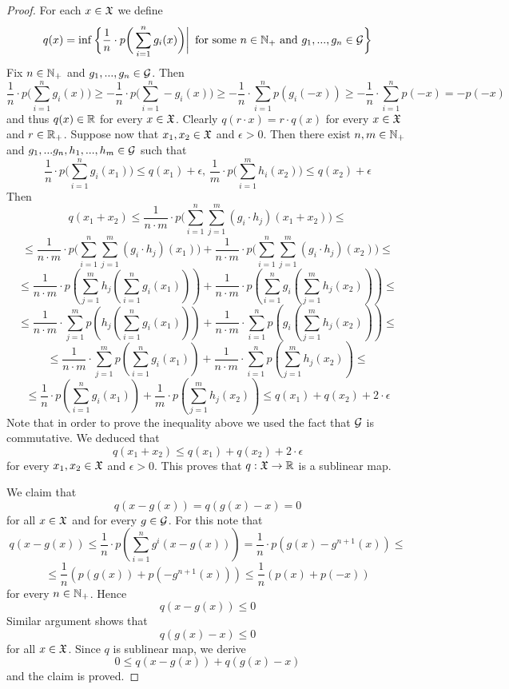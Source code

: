 \documentclass[10pt]{amsart}
\begin{document}
\begin{proof}
	For each $x \in {\mathfrak X}$ we define
	$$q(x) = \inf \bigg\{\frac{1}{n}\cdot p\bigg(\sum_{i=1}^ng_i(x)\bigg)\bigg|\,\mbox{ for some }n\in {\mathbb N}_+\mbox{ and }g_1,...,g_n\in {\mathcal G}\bigg\}$$
	Fix $n\in {\mathbb N}_+$ and $g_1,...,g_n\in {\mathcal G}$. Then
	$$\frac{1}{n}\cdot p\bigg(\sum_{i=1}^ng_i(x)\bigg)\geq -\frac{1}{n}\cdot p\bigg(\sum_{i=1}^n-g_i(x)\bigg) \geq -\frac{1}{n}\cdot \sum_{i=1}^np\left(g_i(-x)\right) \geq -\frac{1}{n}\cdot \sum_{i=1}^np\left(-x\right) = -p(-x)$$
	and thus $q(x) \in {\mathbb R}$ for every $x\in {\mathfrak X}$. Clearly $q(r\cdot x) = r\cdot q(x)$ for every $x\in {\mathfrak X}$ and $r\in {\mathbb R}_+$. Suppose now that $x_1,x_2\in {\mathfrak X}$ and $\epsilon > 0$. Then there exist $n,m \in {\mathbb N}_+$ and $g_1,...g_n,h_1,...,h_m \in {\mathcal G}$ such that
	$$\frac{1}{n}\cdot p\bigg(\sum_{i=1}^ng_i(x_1)\bigg) \leq q(x_1) + \epsilon,\,\frac{1}{m}\cdot p\bigg(\sum_{i=1}^m h_i(x_2)\bigg) \leq q(x_2) + \epsilon$$
	Then
	$$q(x_1 + x_2) \leq \frac{1}{n\cdot m}\cdot p\bigg(\sum_{i=1}^n\sum_{j=1}^m\left(g_i\cdot h_j\right)(x_1 + x_2)\bigg) \leq$$
	$$\leq \frac{1}{n\cdot m}\cdot p\bigg(\sum_{i=1}^n\sum_{j=1}^m \left(g_i\cdot h_j\right)(x_1)\bigg) + \frac{1}{n\cdot m}\cdot p\bigg(\sum_{i=1}^n\sum_{j=1}^m\left(g_i\cdot h_j\right)(x_2)\bigg) \leq$$
	$$\leq \frac{1}{n\cdot m}\cdot p\left(\sum_{j=1}^m h_j\left(\sum_{i=1}^n g_i\left(x_1\right)\right)\right) + \frac{1}{n\cdot m}\cdot p\left(\sum_{i=1}^n g_i\left(\sum_{j=1}^m h_j\left(x_2\right)\right)\right) \leq $$
	$$\leq \frac{1}{n\cdot m}\cdot \sum_{j=1}^m p\left(h_j\left(\sum_{i=1}^n g_i\left(x_1\right)\right)\right) + \frac{1}{n\cdot m}\cdot \sum_{i=1}^n p\left(g_i\left(\sum_{j=1}^m h_j\left(x_2\right)\right)\right) \leq $$
	$$\leq \frac{1}{n\cdot m}\cdot \sum_{j=1}^m p\left(\sum_{i=1}^n g_i\left(x_1\right)\right) + \frac{1}{n\cdot m}\cdot \sum_{i=1}^n p\left(\sum_{j=1}^m h_j\left(x_2\right)\right) \leq $$
	$$\leq  \frac{1}{n}\cdot p\left(\sum_{i=1}^n g_i\left(x_1\right)\right) + \frac{1}{m}\cdot p\left(\sum_{j=1}^m h_j\left(x_2\right)\right) \leq q(x_1) + q(x_2) + 2\cdot \epsilon$$
	Note that in order to prove the inequality above we used the fact that ${\mathcal G}$ is commutative. We deduced that
	$$q(x_1 + x_2) \leq q(x_1) + q(x_2) + 2\cdot \epsilon$$
	for every $x_1,x_2\in {\mathfrak X}$ and $\epsilon > 0$. This proves that $q:{\mathfrak X} \rightarrow {\mathbb R}$ is a sublinear map.

	We claim that
	$$q\left(x - g(x)\right) = q\left(g(x) - x\right) = 0$$
	for all $x\in {\mathfrak X}$ and for every $g\in {\mathcal G}$. For this note that
	$$q\left(x - g(x)\right) \leq \frac{1}{n}\cdot p\left(\sum_{i=1}^ng^i\left(x - g(x)\right)\right) = \frac{1}{n}\cdot p\left(g(x) - g^{n+1}(x)\right) \leq$$
	$$\leq \frac{1}{n}\left(p\left(g(x)\right) + p\left(-g^{n+1}(x)\right)\right) \leq \frac{1}{n}\left(p(x) + p(-x)\right)$$
	for every $n\in {\mathbb N}_+$. Hence
	$$q\left(x - g(x)\right) \leq 0$$
	Similar argument shows that
	$$q\left(g(x) - x\right) \leq 0$$
	for all $x \in {\mathfrak X}$. Since $q$ is sublinear map, we derive
	$$0 \leq q\left(x - g(x)\right) + q\left(g(x) - x\right)$$
	and the claim is proved.


\end{proof}
\end{document}
